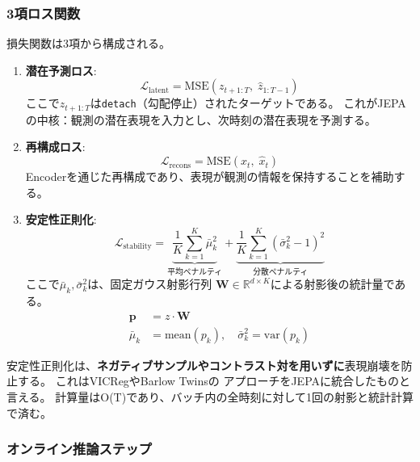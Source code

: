 \documentclass[11pt,a4paper]{ltjsarticle}
\begin{document}
\subsubsection{3項ロス関数}

損失関数は3項から構成される。

\begin{enumerate}
  \item \textbf{潜在予測ロス}:
    \begin{equation}
    \mathcal{L}_{\mathrm{latent}} = \mathrm{MSE}\!\left(z_{t+1:T},\;\hat{z}_{1:T-1}\right)
    \end{equation}
    ここで$z_{t+1:T}$は\texttt{detach}（勾配停止）されたターゲットである。
    これがJEPAの中核：観測の潜在表現を入力とし、次時刻の潜在表現を予測する。

  \item \textbf{再構成ロス}:
    \begin{equation}
    \mathcal{L}_{\mathrm{recons}} = \mathrm{MSE}\!\left(x_t,\;\hat{x}_t\right)
    \end{equation}
    Encoderを通じた再構成であり、表現が観測の情報を保持することを補助する。

  \item \textbf{安定性正則化}:
    \begin{equation}
    \mathcal{L}_{\mathrm{stability}} = \underbrace{
      \frac{1}{K}\sum_{k=1}^{K} \bar{\mu}_k^2
    }_{\text{平均ペナルティ}}
    + \underbrace{
      \frac{1}{K}\sum_{k=1}^{K} \left(\bar{\sigma}_k^2 - 1\right)^2
    }_{\text{分散ペナルティ}}
    \label{eq:stability_loss}
    \end{equation}
    ここで$\bar{\mu}_k, \bar{\sigma}_k^2$は、固定ガウス射影行列
    $\mathbf{W} \in \mathbb{R}^{d \times K}$による射影後の統計量である。
    \begin{align}
    \mathbf{p} &= z \cdot \mathbf{W} \\
    \bar{\mu}_k &= \mathrm{mean}(p_k),\quad
    \bar{\sigma}_k^2 = \mathrm{var}(p_k)
    \end{align}
\end{enumerate}

安定性正則化は、\textbf{ネガティブサンプルやコントラスト対を用いずに}表現崩壊を防止する。
これはVICReg\cite{bardes2022vicreg}やBarlow Twins\cite{zbontar2021barlow}の
アプローチをJEPAに統合したものと言える。
計算量はO(T)であり、バッチ内の全時刻に対して1回の射影と統計計算で済む。

\subsubsection{オンライン推論ステップ}
\end{document}
